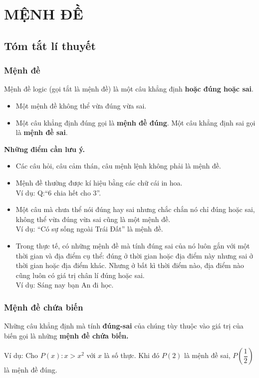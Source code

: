 \section{MỆNH ĐỀ}
\subsection{Tóm tắt lí thuyết}
\subsubsection{Mệnh đề}
\begin{dn} Mệnh đề logic (gọi tắt là mệnh đề) là một câu khẳng định \textbf{hoặc đúng hoặc sai}.
	\begin{itemize}
		\item Một mệnh đề không thể vừa đúng vừa sai.
		\item Một câu khẳng định đúng gọi là \textbf{mệnh đề đúng}. Một câu khẳng định sai gọi là \textbf{mệnh đề sai}.
	\end{itemize}
	
\end{dn}
\begin{note} \textbf{Những điểm cần lưu ý.}
	\begin{itemize}
		\item Các câu hỏi, câu cảm thán, câu mệnh lệnh không phải là mệnh đề.
		\item Mệnh đề thường được kí hiệu bằng các chữ cái in hoa.\\
		\hspace{3cm} Ví dụ: Q:``6 chia hết cho 3''.
		\item Một câu mà chưa thể nói đúng hay sai nhưng chắc chắn nó chỉ đúng hoặc sai, không thể vừa đúng vừa sai cũng là một mệnh đề.\\
		\hspace{3cm} Ví dụ: ``Có sự sống ngoài Trái Đất'' là mệnh đề.
		\item Trong thực tế, có những mệnh đề mà tính đúng sai của nó luôn gắn với một thời gian và địa điểm cụ thể: đúng ở thời gian hoặc địa điểm này nhưng sai ở thời gian hoặc địa điểm khác. Nhưng ở bất kì thời điểm nào, địa điểm nào cũng luôn có giá trị chân lí đúng hoặc sai.\\
		Ví dụ: Sáng nay bạn An đi học.\\
	\end{itemize}
\end{note}
\subsubsection{Mệnh đề chứa biến}
\begin{dn}
	Những câu khẳng định mà tính \textbf{đúng-sai} của chúng tùy thuộc vào giá trị của biến gọi là những \textbf{mệnh đề chứa biến.}
\end{dn}
Ví dụ: Cho $P(x): x>x^2$ với $x$ là số thực. Khi đó $P(2)$ là mệnh đề sai, $P\left(\dfrac{1}{2}\right)$ là mệnh đề đúng.
